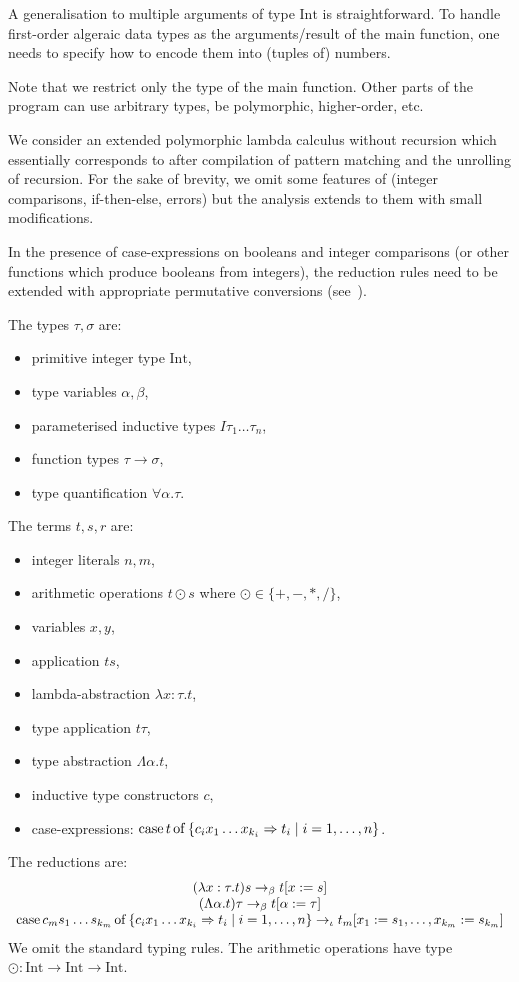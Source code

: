 \documentclass[final]{msc}
\begin{document}
A generalisation to multiple arguments of type $\mathrm{Int}$ is
straightforward. To handle first-order algeraic data types as the
arguments/result of the main function, one needs to specify how to
encode them into (tuples of) numbers.

Note that we restrict only the type of the main function. Other parts
of the program can use arbitrary types, be polymorphic, higher-order,
etc.

We consider an extended polymorphic lambda calculus without recursion
which essentially corresponds to \JuvixCore{} after compilation of
pattern matching and the unrolling of recursion. For the sake of
brevity, we omit some features of \JuvixCore{} (integer comparisons, if-then-else, errors) but
the analysis extends to them with small modifications.

In the presence of case-expressions on booleans and integer comparisons (or other functions which produce booleans from integers), the reduction rules need to be extended with appropriate permutative conversions (see~\cite[Chapter~6]{basic-proof-theory}).

\medskip

\noindent The types $\tau,\sigma$ are:
\begin{itemize}
\item primitive integer type $\mathrm{Int}$,
\item type variables $\alpha,\beta$,
\item parameterised inductive types $I \tau_1 \ldots \tau_n$,
\item function types $\tau \to \sigma$,
\item type quantification $\forall \alpha . \tau$.
\end{itemize}
The terms $t,s,r$ are:
\begin{itemize}
\item integer literals $n, m$,
\item arithmetic operations $t \odot s$ where $\odot \in \{ {+}, {-}, {*}, {/} \}$,
\item variables $x,y$,
\item application $t s$,
\item lambda-abstraction $\lambda x : \tau . t$,
\item type application $t \tau$,
\item type abstraction $\Lambda \alpha . t$,
\item inductive type constructors $c$,
\item case-expressions: $\mathrm{case}\,t\,\mathrm{of}\,\{ c_i x_1 \ldots x_{k_i} \Rightarrow t_i \mid i = 1,\ldots,n\}$.
\end{itemize}
The reductions are:
\[
\begin{array}{c}
  (\lambda x : \tau . t) s \to_\beta t[x := s]\\
  (\Lambda \alpha . t) \tau \to_\beta t[\alpha := \tau]\\
  \mathrm{case}\,c_m s_1 \ldots s_{k_m}\,\mathrm{of}\,\{ c_i x_1 \ldots x_{k_i} \Rightarrow t_i \mid i = 1,\ldots,n\} \to_\iota t_m[x_1 := s_1,\ldots,x_{k_m} := s_{k_m}]
\end{array}
\]
We omit the standard typing rules. The arithmetic operations
have type $\odot : \mathrm{Int} \to \mathrm{Int} \to \mathrm{Int}$.
\end{document}
